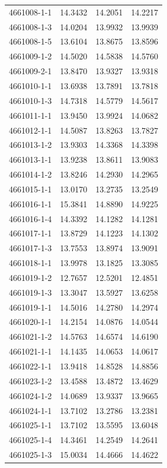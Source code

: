 \begin{longtable}{lrrr}
4661008-1-1 & 14.3432 & 14.2051 & 14.2217 \\
4661008-1-3 & 14.0204 & 13.9932 & 13.9939 \\
4661008-1-5 & 13.6104 & 13.8675 & 13.8596 \\
4661009-1-2 & 14.5020 & 14.5838 & 14.5760 \\
4661009-2-1 & 13.8470 & 13.9327 & 13.9318 \\
4661010-1-1 & 13.6938 & 13.7891 & 13.7818 \\
4661010-1-3 & 14.7318 & 14.5779 & 14.5617 \\
4661011-1-1 & 13.9450 & 13.9924 & 14.0682 \\
4661012-1-1 & 14.5087 & 13.8263 & 13.7827 \\
4661013-1-2 & 13.9303 & 14.3368 & 14.3398 \\
4661013-1-1 & 13.9238 & 13.8611 & 13.9083 \\
4661014-1-2 & 13.8246 & 14.2930 & 14.2965 \\
4661015-1-1 & 13.0170 & 13.2735 & 13.2549 \\
4661016-1-1 & 15.3841 & 14.8890 & 14.9225 \\
4661016-1-4 & 14.3392 & 14.1282 & 14.1281 \\
4661017-1-1 & 13.8729 & 14.1223 & 14.1302 \\
4661017-1-3 & 13.7553 & 13.8974 & 13.9091 \\
4661018-1-1 & 13.9978 & 13.1825 & 13.3085 \\
4661019-1-2 & 12.7657 & 12.5201 & 12.4851 \\
4661019-1-3 & 13.3047 & 13.5927 & 13.6258 \\
4661019-1-1 & 14.5016 & 14.2780 & 14.2974 \\
4661020-1-1 & 14.2154 & 14.0876 & 14.0544 \\
4661021-1-2 & 14.5763 & 14.6574 & 14.6190 \\
4661021-1-1 & 14.1435 & 14.0653 & 14.0617 \\
4661022-1-1 & 13.9418 & 14.8528 & 14.8856 \\
4661023-1-2 & 13.4588 & 13.4872 & 13.4629 \\
4661024-1-2 & 14.0689 & 13.9337 & 13.9665 \\
4661024-1-1 & 13.7102 & 13.2786 & 13.2381 \\
4661025-1-1 & 13.7102 & 13.5595 & 13.6048 \\
4661025-1-4 & 14.3461 & 14.2549 & 14.2641 \\
4661025-1-3 & 15.0034 & 14.4666 & 14.4622 \\

\end{longtable}
